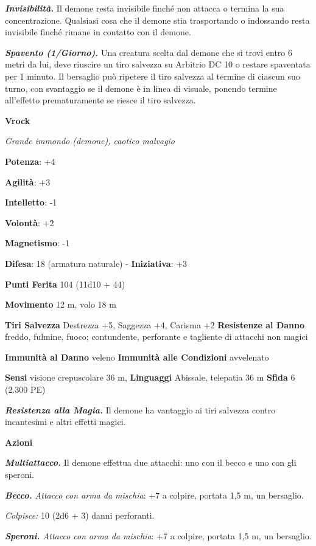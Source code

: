 \begin{multicols}{2}
\emph{\textbf{Invisibilità.}} Il demone resta invisibile finché non
attacca o termina la sua concentrazione. Qualsiasi cosa che il demone
stia trasportando o indossando resta invisibile finché rimane in
contatto con il demone.

\emph{\textbf{Spavento (1/Giorno).}} Una creatura scelta dal demone che
si trovi entro 6 metri da lui, deve riuscire un tiro salvezza su Arbitrio DC 10 o restare spaventata per 1 minuto. Il bersaglio può
ripetere il tiro salvezza al termine di ciascun suo turno, con
svantaggio se il demone è in linea di visuale, ponendo termine
all'effetto prematuramente se riesce il tiro salvezza.


\textbf{Vrock}

\emph{Grande immondo (demone), caotico malvagio}

\textbf{Potenza}: +4

\textbf{Agilità}: +3

\textbf{Intelletto}: -1

\textbf{Volontà}: +2

\textbf{Magnetismo}: -1

\textbf{Difesa}: 18 (armatura naturale) - \textbf{Iniziativa}: +3

\textbf{Punti Ferita} 104 (11d10 + 44)

\textbf{Movimento} 12 m, volo 18 m

\textbf{Tiri Salvezza} Destrezza +5, Saggezza +4, Carisma +2
\textbf{Resistenze al Danno} freddo, fulmine, fuoco; contundente,
perforante e tagliente di attacchi non magici

\textbf{Immunità al Danno} veleno \textbf{Immunità alle Condizioni}
avvelenato

\textbf{Sensi} visione crepuscolare 36 m, 
\textbf{Linguaggi} Abissale, telepatia 36 m \textbf{Sfida} 6 (2.300 PE)

\emph{\textbf{Resistenza alla Magia.}} Il demone ha vantaggio ai tiri
salvezza contro incantesimi e altri effetti magici.

\textbf{Azioni}

\emph{\textbf{Multiattacco.}} Il demone effettua due attacchi: uno con
il becco e uno con gli speroni.

\emph{\textbf{Becco.} Attacco con arma da mischia}: +7 a colpire,
portata 1,5 m, un bersaglio.

\emph{Colpisce:} 10 (2d6 + 3) danni perforanti.

\emph{\textbf{Speroni.} Attacco con arma da mischia}: +7 a colpire,
portata 1,5 m, un bersaglio.


\end{multicols}
